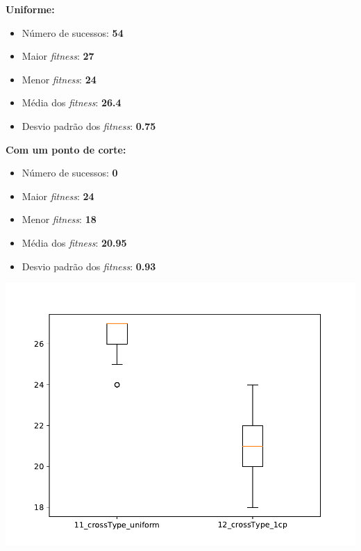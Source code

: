 \documentclass[11pt,a4paper]{article}
\begin{document}
\begin{minipage}{0.5\linewidth}
\textbf{Uniforme:}
\begin{itemize}
	\footnotesize
	\setlength\itemsep{0em}
	\item Número de sucessos: \textbf{54}
	\item Maior \textit{fitness}: \textbf{27}
	\item Menor \textit{fitness}: \textbf{24}
	\item Média dos \textit{fitness}: \textbf{26.4}
	\item Desvio padrão dos \textit{fitness}: \textbf{0.75}
\end{itemize}
\end{minipage}
\begin{minipage}{0.5\linewidth}
\textbf{Com um ponto de corte:}
\begin{itemize}
	\footnotesize
	\setlength\itemsep{0em}
	\item Número de sucessos: \textbf{0}
	\item Maior \textit{fitness}: \textbf{24}
	\item Menor \textit{fitness}: \textbf{18}
	\item Média dos \textit{fitness}: \textbf{20.95}
	\item Desvio padrão dos \textit{fitness}: \textbf{0.93}
\end{itemize}
\end{minipage}
\includegraphics[scale=0.5]{teste1.pdf} 
\end{document}
